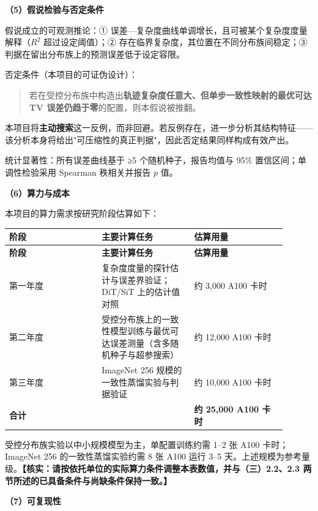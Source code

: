 \documentclass[12pt,a4paper]{ctexart}
\begin{document}
\textbf{（5）假说检验与否定条件}

假说成立的可观测推论：① 误差—复杂度曲线单调增长，且可被某个复杂度度量解释（$R^2$ 超过设定阈值）；② 存在临界复杂度，其位置在不同分布族间稳定；③ 判据在留出分布族上的预测误差低于设定容限。

否定条件（本项目的可证伪设计）：

\begin{quote}\small
若在受控分布族中构造出\textbf{轨迹复杂度任意大、但单步一致性映射的最优可达 TV 误差仍趋于零}的配置，则本假说被推翻。

\end{quote}

本项目将\textbf{主动搜索}这一反例，而非回避。若反例存在，进一步分析其结构特征——该分析本身将给出"可压缩性的真正判据"，因此否定结果同样构成有效产出。

统计显著性：所有误差曲线基于 ≥5 个随机种子，报告均值与 95\% 置信区间；单调性检验采用 Spearman 秩相关并报告 $p$ 值。

\textbf{（6）算力与成本}

本项目的算力需求按研究阶段估算如下：

\begin{longtable}{|>{\raggedright\arraybackslash}p{0.300\linewidth}|>{\raggedright\arraybackslash}p{0.300\linewidth}|>{\raggedright\arraybackslash}p{0.300\linewidth}|}
\hline
\textbf{阶段} & \textbf{主要计算任务} & \textbf{估算用量} \\
\hline
\endfirsthead
\hline
\textbf{阶段} & \textbf{主要计算任务} & \textbf{估算用量} \\
\hline
\endhead
第一年度 & 复杂度度量的探针估计与误差界验证；DiT/SiT 上的估计值对照 & 约 3,000 A100 卡时 \\
\hline
第二年度 & 受控分布族上的一致性模型训练与最优可达误差测量（含多随机种子与超参搜索） & 约 12,000 A100 卡时 \\
\hline
第三年度 & ImageNet 256 规模的一致性蒸馏实验与判据验证 & 约 10,000 A100 卡时 \\
\hline
\textbf{合计} &  & \textbf{约 25,000 A100 卡时} \\
\hline
\end{longtable}

受控分布族实验以中小规模模型为主，单配置训练约需 1–2 张 A100 卡时；ImageNet 256 的一致性蒸馏实验约需 8 张 A100 运行 3–5 天。上述规模为参考量级。\textbf{【核实：请按依托单位的实际算力条件调整本表数值，并与（三）2.2、2.3 两节所述的已具备条件与尚缺条件保持一致。】}

\textbf{（7）可复现性}
\end{document}
